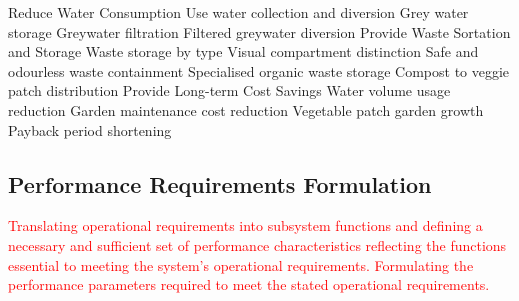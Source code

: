 \documentclass[a4paper,11pt,fleqn]{report}
\begin{document}
Reduce Water Consumption
Use water collection and diversion
Grey water storage
Greywater filtration
Filtered greywater diversion 
Provide Waste Sortation and Storage
Waste storage by type
Visual compartment distinction 
Safe and odourless waste containment 
Specialised organic waste storage
Compost to veggie patch distribution 
Provide Long-term Cost Savings
Water volume usage reduction
Garden maintenance cost reduction
Vegetable patch garden growth 
Payback period shortening


\subsection{Performance Requirements Formulation}
\textcolor{red}{Translating operational requirements into subsystem functions and defining a necessary and sufficient set of performance characteristics reflecting the functions essential to meeting the system’s operational requirements. Formulating the performance parameters required to meet the stated operational requirements.}
\end{document}
